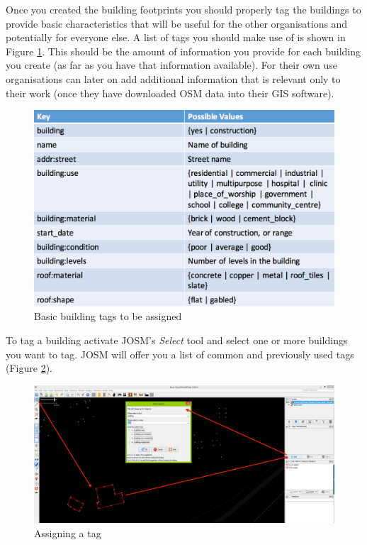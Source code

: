\documentclass[a4paper,12pt,titlepage]{article}
\begin{document}
Once you created the building footprints you should properly tag the buildings to provide basic characteristics that will be useful for the other organisations and potentially for everyone else. A list of tags you should make use of is shown in Figure \ref{fig:building_tags}. This should be the amount of information you provide for each building you create (as far as you have that information available). For their own use organisations can later on add additional information that is relevant only to their work (once they have downloaded OSM data into their GIS software).

\begin{figure}[H]
	\centering
	\includegraphics[width=12cm]{Images/building_tags.png}
	\caption{Basic building tags to be assigned}\label{fig:building_tags}
\end{figure}

To tag a building activate JOSM's \textit{Select} tool and select one or more buildings you want to tag. JOSM will offer you a list of common and previously used tags (Figure \ref{fig:building_tags_2}).

\begin{figure}[H]
	\centering
	\includegraphics[width=12cm]{Images/building_tags_2.png}
	\caption{Assigning a tag}\label{fig:building_tags_2}
\end{figure}
\end{document}
